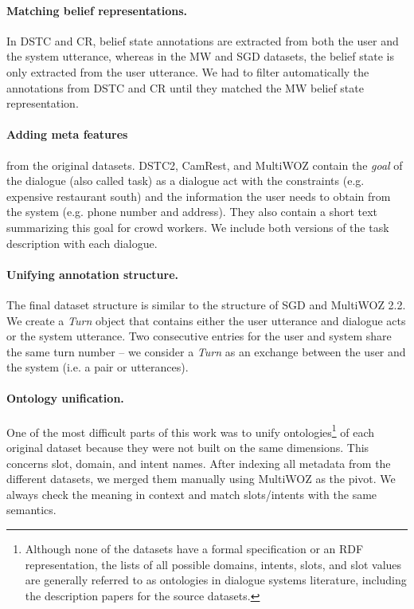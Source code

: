\paragraph{Matching belief representations.} In DSTC and CR, belief state annotations are extracted from both the user and the system utterance, whereas in the MW and SGD datasets, the belief state is only extracted from the user utterance. We had to filter automatically the annotations from DSTC and CR until they matched the MW belief state representation. 
    
\paragraph{Adding meta features} from the original datasets. DSTC2, CamRest, and MultiWOZ contain the \emph{goal} of the dialogue (also called task) as a dialogue act with the constraints (e.g. expensive restaurant south) and the information the user needs to obtain from the system (e.g. phone number and address). They also contain a short text summarizing this goal for crowd workers. We include both versions of the task description with each dialogue.
    
\paragraph{Unifying annotation structure.} The final dataset structure is similar to the structure of SGD and MultiWOZ 2.2. We create a \textit{Turn} object that contains either the user utterance and dialogue acts or the system utterance.
Two consecutive entries for the user and system share the same turn number -- we consider a \textit{Turn} as an exchange between the user and the system (i.e. a pair or utterances). 

\paragraph{Ontology unification.}   
One of the most difficult parts of this work was to unify ontologies\footnote{Although none of the datasets have a formal specification or an RDF representation, the lists of all possible domains, intents, slots, and slot values are generally referred to as ontologies in dialogue systems literature, including the description papers for the source datasets.} of each original dataset because they were not built on the same dimensions.
This concerns slot, domain, and intent names. After indexing all metadata from the different datasets, we merged them manually using MultiWOZ as the pivot.
We always check the meaning in context and match slots/intents with the same semantics.

